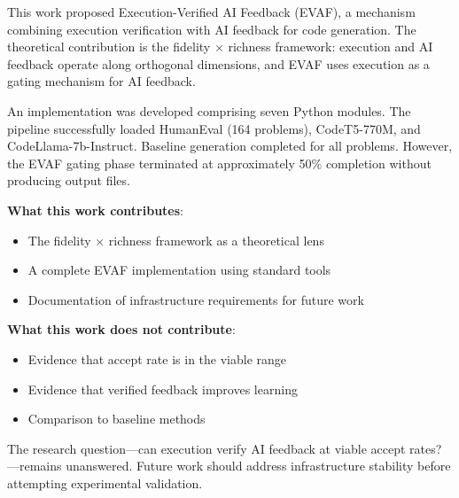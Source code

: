 
This work proposed Execution-Verified AI Feedback (EVAF), a mechanism combining execution verification with AI feedback for code generation. The theoretical contribution is the fidelity $\times$ richness framework: execution and AI feedback operate along orthogonal dimensions, and EVAF uses execution as a gating mechanism for AI feedback.

An implementation was developed comprising seven Python modules. The pipeline successfully loaded HumanEval (164 problems), CodeT5-770M, and CodeLlama-7b-Instruct. Baseline generation completed for all problems. However, the EVAF gating phase terminated at approximately 50\% completion without producing output files.

\textbf{What this work contributes}:
\begin{itemize}
\item The fidelity $\times$ richness framework as a theoretical lens
\item A complete EVAF implementation using standard tools
\item Documentation of infrastructure requirements for future work
\end{itemize}

\textbf{What this work does not contribute}:
\begin{itemize}
\item Evidence that accept rate is in the viable range
\item Evidence that verified feedback improves learning
\item Comparison to baseline methods
\end{itemize}

The research question---can execution verify AI feedback at viable accept rates?---remains unanswered. Future work should address infrastructure stability before attempting experimental validation.
